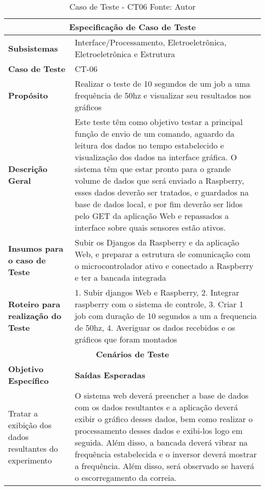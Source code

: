 \begin{table}[H]
    \begin{center}
        \begin{tabular}{|p{5cm}|p{12cm}|}
            \hline
            \multicolumn{2}{|c|}{\textbf{Especificação de Caso de Teste}} \\ \hline
                \textbf{Subsistemas}                               &  Interface/Processamento, Eletroeletrônica, Eletroeletrônica e Estrutura \\ \hline
                \textbf{Caso de Teste}                             & CT-06 \\ \hline
                \textbf{Propósito}                                     & Realizar o teste de 10 segundos de um job a uma frequência de 50hz e visualizar seu resultados nos gráficos \\ \hline
                \textbf{Descrição Geral}                           & Este teste têm como objetivo testar a principal função de envio de um comando, aguardo da leitura dos dados no tempo estabelecido e visualização dos dados na interface gráfica. O sistema têm que estar pronto para o grande volume de dados que será enviado a Raspberry, esses dados deverão ser tratados, e guardados na base de dados local, e por fim deverão ser lidos pelo GET da aplicação Web e repassados a interface sobre quais sensores estão ativos. \\ \hline
                \textbf{Insumos para o caso de Teste}    & Subir os Djangos da Raspberry e da aplicação Web, e preparar a estrutura de comunicação com o microcontrolador ativo e conectado a Raspberry e ter a bancada integrada\\ \hline
                \textbf{Roteiro para realização do Teste}&  1. Subir djangos Web e Raspberry, 2. Integrar raspberry com o sistema de controle, 3. Criar 1 job com duração de 10 segundos a um a frequencia de 50hz, 4. Averiguar os dados recebidos e os gráficos que foram montados  \\ \hline
            \multicolumn{2}{|c|}{\textbf{Cenários de Teste}} \\ \hline
                \textbf{Objetivo Específico}                      & \textbf{Saídas Esperadas} \\ \hline
                Tratar a exibição dos dados resultantes do experimento & O sistema web deverá preencher a base de dados com os dados resultantes e a aplicação deverá exibir o gráfico desses dados, bem como realizar o processamento desses dados e exibi-los logo em seguida.  Além disso, a bancada deverá vibrar na frequência estabelecida e o inversor deverá mostrar a frequência. Além disso, será observado se haverá o escorregamento da correia. \\ \hline
        \end{tabular}
    \end{center}
    \caption[Caso de Teste - CT06]{Caso de Teste - CT06
    \protect Fonte: Autor}
    \label{CT-06}
\end{table}

